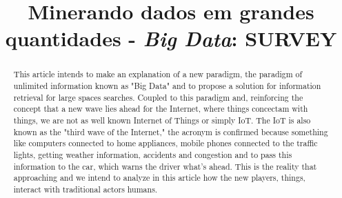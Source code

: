 \documentclass[conference,compsoc]{IEEEtran}
\begin{document}
%
\title{Minerando dados em grandes quantidades - \textit{Big Data}: SURVEY}


\author{
\and
{}
}



\maketitle

\begin{abstract}
This article intends to make an explanation of a new paradigm, the paradigm of unlimited information known as "Big Data" and to propose a solution for information retrieval for large spaces searches. Coupled to this paradigm and, reinforcing the concept that a new wave lies ahead for the Internet, where things concectam with things, we are not as well known Internet of Things   or simply IoT. The IoT is also known as the "third wave of the Internet," the acronym is confirmed because something like computers connected to home appliances, mobile phones connected to the traffic lights, getting weather information, accidents and congestion and to pass this information to the car, which warns the driver what's ahead. This is the reality that approaching and we intend to analyze in this article how the new players, things, interact with traditional actors humans.
\end{abstract}
\end{document}
